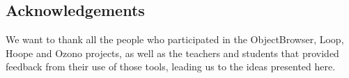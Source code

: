 \documentclass[preprint,10pt,nocopyrightspace]{sigplanconf}
\begin{document}





\subsection{Acknowledgements}
We want to thank all the people who participated in the ObjectBrowser, Loop, Hoope and Ozono projects, 
as well as the teachers and students that provided feedback from their use of those tools, leading us to the ideas presented here.

{
\small


}


\end{document}
